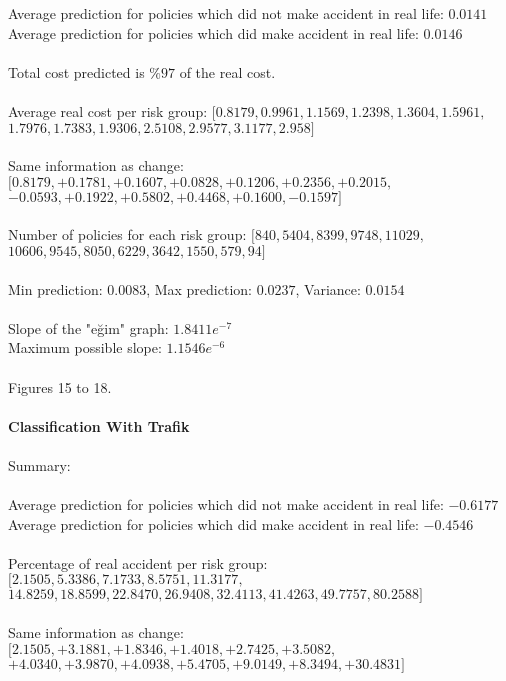 \documentclass[titlepage, a4paper, 14pt]{extarticle} %
\begin{document}
Average prediction for policies which did not make accident in real life: $0.0141$ \\
Average prediction for policies which did make accident in real life: $0.0146$ \\\\
Total cost predicted is $\%97$ of the real cost. \\\\
Average real cost per risk group: $[0.8179, 0.9961, 1.1569, 1.2398, 1.3604, 1.5961,$\\$ 1.7976, 1.7383, 1.9306, 2.5108, 2.9577, 3.1177, 2.958]$ \\\\
Same information as change: $[0.8179, +0.1781, +0.1607,+ 0.0828, +0.1206,+ 0.2356, +0.2015,$\\$ -0.0593, +0.1922,+ 0.5802, +0.4468, +0.1600, -0.1597]$ \\\\
Number of policies for each risk group:  $[840, 5404, 8399, 9748, 11029,$\\$ 10606, 9545, 8050, 6229, 3642, 1550, 579, 94]$\\\\
Min prediction: $0.0083$, Max prediction: $0.0237$, Variance: $0.0154$ \\\\
Slope of the "eğim" graph: $1.8411 e^{-7}$ \\
Maximum possible slope:  $1.1546 e^{-6}$ \\\\
Figures 15 to 18.\\\\
\textbf{Classification With Trafik} \\\\
Summary: \\\\
Average prediction for policies which did not make accident in real life: $-0.6177$ \\
Average prediction for policies which did make accident in real life: $-0.4546$ \\\\
Percentage of real accident per risk group:\\ $[2.1505, 5.3386, 7.1733, 8.5751, 11.3177,$\\$ 14.8259, 18.8599, 22.8470, 26.9408, 32.4113, 41.4263, 49.7757, 80.2588]$ \\\\
Same information as change: $[2.1505,+3.1881, +1.8346, +1.4018, +2.7425, +3.5082,$\\$ +4.0340, +3.9870, +4.0938, +5.4705,+9.0149, +8.3494, +30.4831]$ \\\\
\end{document}

